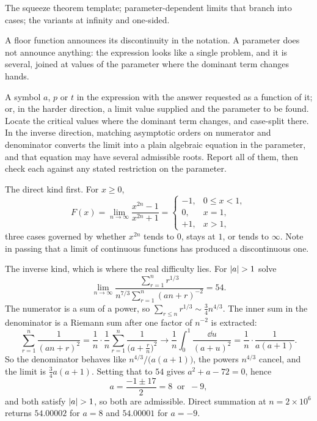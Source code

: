 \begin{seealsob}The squeeze theorem template; parameter-dependent limits that branch into cases; the variants at infinity and one-sided.\end{seealsob}

A floor function announces its discontinuity in the notation. A parameter does not announce anything: the expression looks like a single problem, and it is several, joined at values of the parameter where the dominant term changes hands.

\cue A symbol $a$, $p$ or $t$ in the expression with the answer requested as a function of it; or, in the harder direction, a limit value supplied and the parameter to be found.
\method Locate the critical values where the dominant term changes, and case-split there. In the inverse direction, matching asymptotic orders on numerator and denominator converts the limit into a plain algebraic equation in the parameter, and that equation may have several admissible roots. Report all of them, then check each against any stated restriction on the parameter.

\begin{worked}
The direct kind first. For $x\geq0$,
\[F(x)=\lim_{n\to\infty}\frac{x^{2n}-1}{x^{2n}+1}=\begin{cases}-1,&0\leq x<1,\\ 0,&x=1,\\ +1,&x>1,\end{cases}\]
three cases governed by whether $x^{2n}$ tends to $0$, stays at $1$, or tends to $\infty$. Note in passing that a limit of continuous functions has produced a discontinuous one.

The inverse kind, which is where the real difficulty lies. For $\left\lvert a\right\rvert>1$ solve
\[\lim_{n\to\infty}\frac{\sum_{r=1}^{n}r^{1/3}}{n^{7/3}\sum_{r=1}^{n}(an+r)^{-2}}=54 .\]
The numerator is a sum of a power, so $\sum_{r\leq n}r^{1/3}\sim\tfrac34n^{4/3}$. The inner sum in the denominator is a Riemann sum after one factor of $n^{-2}$ is extracted:
\[\sum_{r=1}^{n}\frac{1}{(an+r)^{2}}=\frac{1}{n}\cdot\frac1n\sum_{r=1}^{n}\frac{1}{\bigl(a+\tfrac rn\bigr)^{2}}\longrightarrow\frac1n\int_{0}^{1}\frac{\dd u}{(a+u)^{2}}=\frac1n\cdot\frac{1}{a(a+1)} .\]
So the denominator behaves like $n^{4/3}/\bigl(a(a+1)\bigr)$, the powers $n^{4/3}$ cancel, and the limit is $\tfrac34a(a+1)$. Setting that to $54$ gives $a^{2}+a-72=0$, hence
\[a=\frac{-1\pm17}{2}=8\ \text{ or }\ -9 ,\]
and both satisfy $\left\lvert a\right\rvert>1$, so both are admissible. Direct summation at $n=2\times10^{6}$ returns $54.00002$ for $a=8$ and $54.00001$ for $a=-9$.
\end{worked}

